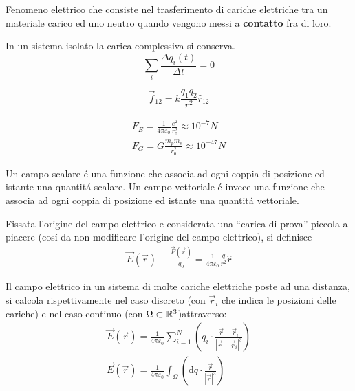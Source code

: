 \begin{multicols}{3}
  Fenomeno elettrico che consiste nel trasferimento di cariche elettriche tra
  un materiale carico ed uno neutro quando vengono messi a \textbf{contatto}
  fra di loro.

  In un sistema isolato la carica complessiva si conserva.
  \begin{equation}
    \label{eq:conservazione-carica}
    \sum_i \frac{\Delta q_i(t)}{\Delta t} = 0
  \end{equation}

  \begin{equation}
    \label{eq:legge-coulomb}
    \vec{f}_{12} = k\frac{q_1q_2}{r^2}\hat{r}_{12}
  \end{equation}

  \begin{equation}
    \label{eq:odg-forze}
    \begin{gathered}
      F_E = \frac{1}{4\pi\varepsilon_0}\frac{e^2}{r_0^2} \approx 10^{-7} N \\
      F_G = G\frac{m_pm_e}{r_0^2} \approx 10^{-47} N
    \end{gathered}
  \end{equation}

  Un campo scalare \'e una funzione che associa ad ogni coppia di posizione ed
  istante una quantit\'a scalare. Un campo vettoriale \'e invece una funzione
  che associa ad ogni coppia di posizione ed istante una quantit\'a vettoriale.
  
  Fissata l'origine del campo elettrico e considerata una ``carica di prova''
  piccola a piacere (cos\'i da non modificare l'origine del campo elettrico),
  si definisce
  \begin{equation}
    \label{eq:campo-elettrico}
    \begin{gathered}
      \vec{E}(\vec{r}) \equiv \frac{\vec{F}(\vec{r})}{q_0} =
      \frac{1}{4\pi\varepsilon_0}\frac{q}{r^2}\hat{r}
    \end{gathered}
  \end{equation}

  Il campo elettrico in un sistema di molte cariche elettriche poste ad una
  distanza, si calcola rispettivamente nel caso discreto
  (con $\vec{r}_i$ che indica le posizioni delle cariche)
  e nel caso continuo (con $\Omega \subset \mathbb{R}^3$)attraverso:
  \begin{equation}
    \label{eq:somma-campi-elettrici}
    \begin{gathered}
      \vec{E}(\vec{r}) =
      \frac{1}{4\pi\varepsilon_0}
      \sum_{i=1}^N \left(
        q_i\cdot\frac{\vec{r} - \vec{r}_i}{|\vec{r} - \vec{r}_i|^3}
      \right) \\
      \vec{E}(\vec{r}) =
      \frac{1}{4\pi\varepsilon_0}
      \int_{\Omega}\left(
        \text{d}q\cdot\frac{\vec{r}}{|\vec{r}|^3}
      \right) \\
    \end{gathered}
  \end{equation}


\end{multicols}
